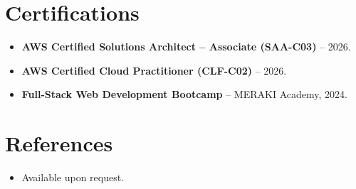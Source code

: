 \documentclass[11pt,a4paper,sans]{moderncv}
\begin{document}

\section{Certifications}
\vspace{1pt}
\begin{itemize}
\item{\textbf{AWS Certified Solutions Architect -- Associate (SAA-C03)} -- 2026.}
\item{\textbf{AWS Certified Cloud Practitioner (CLF-C02)} -- 2026.}
\item{\textbf{Full-Stack Web Development Bootcamp} -- MERAKI Academy, 2024.}
\end{itemize}


\section{References}
\vspace{1pt}
\begin{itemize}
\item{Available upon request.}
\end{itemize}
\end{document}
